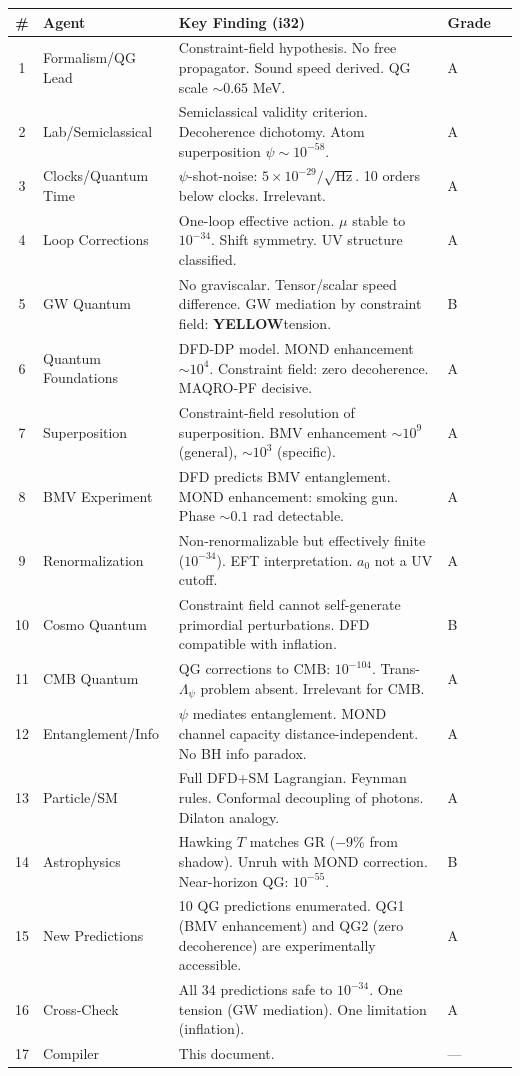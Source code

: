 \documentclass[11pt,a4paper]{article}
\newcommand{\YELLOW}{\textcolor{dfdyellow}{\textbf{YELLOW}}}
\begin{document}
\begin{center}
\begin{longtable}{clp{6cm}lc}
\toprule
\textbf{\#} & \textbf{Agent} & \textbf{Key Finding (i32)} & \textbf{Grade} \\
\midrule
\endfirsthead
1 & Formalism/QG Lead & Constraint-field hypothesis. No free propagator. Sound speed derived. QG scale $\sim 0.65$ MeV. & A \\
2 & Lab/Semiclassical & Semiclassical validity criterion. Decoherence dichotomy. Atom superposition $\psi \sim 10^{-58}$. & A \\
3 & Clocks/Quantum Time & $\psi$-shot-noise: $5\times 10^{-29}/\sqrt{\text{Hz}}$. 10 orders below clocks. Irrelevant. & A \\
4 & Loop Corrections & One-loop effective action. $\mu$ stable to $10^{-34}$. Shift symmetry. UV structure classified. & A \\
5 & GW Quantum & No graviscalar. Tensor/scalar speed difference. GW mediation by constraint field: \YELLOW tension. & B \\
6 & Quantum Foundations & DFD-DP model. MOND enhancement $\sim 10^4$. Constraint field: zero decoherence. MAQRO-PF decisive. & A \\
7 & Superposition & Constraint-field resolution of superposition. BMV enhancement $\sim 10^9$ (general), $\sim 10^3$ (specific). & A \\
8 & BMV Experiment & DFD predicts BMV entanglement. MOND enhancement: smoking gun. Phase $\sim 0.1$ rad detectable. & A \\
9 & Renormalization & Non-renormalizable but effectively finite ($10^{-34}$). EFT interpretation. $a_0$ not a UV cutoff. & A \\
10 & Cosmo Quantum & Constraint field cannot self-generate primordial perturbations. DFD compatible with inflation. & B \\
11 & CMB Quantum & QG corrections to CMB: $10^{-104}$. Trans-$\Lambda_\psi$ problem absent. Irrelevant for CMB. & A \\
12 & Entanglement/Info & $\psi$ mediates entanglement. MOND channel capacity distance-independent. No BH info paradox. & A \\
13 & Particle/SM & Full DFD+SM Lagrangian. Feynman rules. Conformal decoupling of photons. Dilaton analogy. & A \\
14 & Astrophysics & Hawking $T$ matches GR ($-9\%$ from shadow). Unruh with MOND correction. Near-horizon QG: $10^{-55}$. & B \\
15 & New Predictions & 10 QG predictions enumerated. QG1 (BMV enhancement) and QG2 (zero decoherence) are experimentally accessible. & A \\
16 & Cross-Check & All 34 predictions safe to $10^{-34}$. One tension (GW mediation). One limitation (inflation). & A \\
17 & Compiler & This document. & --- \\
\bottomrule
\end{longtable}
\end{center}
\end{document}
